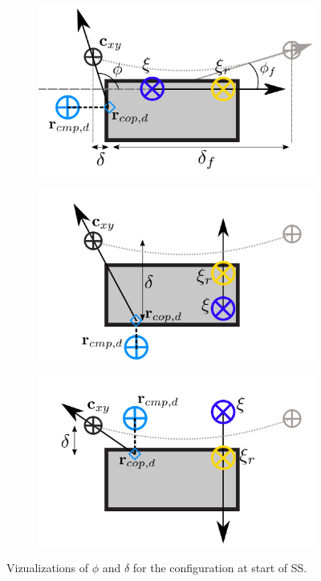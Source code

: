 \begin{figure}[h]
\begin{subfigure}{0.49\textwidth}
   \caption{}
    \label{fig:phiViza}
  \end{subfigure}
  \begin{subfigure}{0.49\textwidth}
    \centering
  \includegraphics[width=.7\linewidth]{STYLESTUFF/ICPplanStartSSPhiViz.png}
  \caption{}
   \label{fig:phiVizb}
  \end{subfigure}
    \begin{subfigure}{0.49\textwidth}
    \centering
  \includegraphics[width=.7\linewidth]{STYLESTUFF/ICPplanStartSSPhiVizLeftError.png}
    \caption{}
     \label{fig:phiVize}
  \end{subfigure}
  \begin{subfigure}{0.49\textwidth}
    \centering
  \includegraphics[width=.7\linewidth]{STYLESTUFF/ICPplanStartSSPhiVizRightError.png}
    \caption{}
     \label{fig:phiVizf}
  \end{subfigure}
  \caption{Vizualizations of $\phi$ and $\delta$ for the configuration at start of \ac{SS}.}
  \label{fig:phiViz}
\end{figure}

